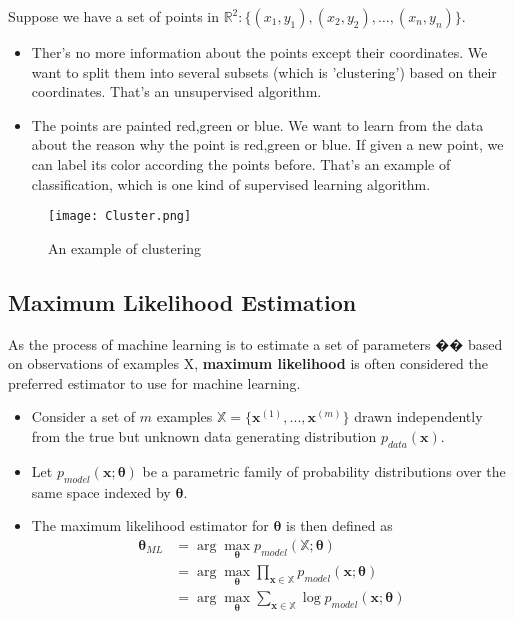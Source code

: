      Suppose we have a set of points in $\mathbb{R}^2: \{(x_1,y_1),(x_2,y_2),\dots,(x_n,y_n)\}$.
     \begin{itemize}
         \item Ther's no more information about the points except their coordinates. We want to split them into several subsets (which is 'clustering') based on their coordinates. That's an unsupervised algorithm.
         \item The points are painted red,green or blue. We want to learn from the data about the reason why the point is red,green or blue. If given a new point, we can label its color according the points before. That's an example of classification, which is one kind of supervised learning algorithm.
     \end{itemize}
     \begin{figure}[htbp]
         \centering
         \texttt{[image: Cluster.png]}
         \caption{An example of clustering}
     \end{figure}
    \subsection{Maximum Likelihood Estimation}
    As the process of machine learning is to estimate a set of parameters �� based on observations of examples X, \textbf{maximum likelihood} is often considered the preferred estimator to use for machine learning.	

    \begin{itemize}
        \item Consider a set of $m$ examples $\mathbb X=\{\bm x^{(1)},...,\bm x^{(m)}\}$ drawn independently from the true but unknown data generating distribution $p_{data}(\bm x)$.
        \item Let $p_{model}(\bm x;\bm \theta)$ be a parametric family of probability distributions over the same space indexed by $\bm \theta$.
        \item The maximum likelihood estimator for $\bm \theta$ is then defined as 
            \begin{equation*}
                \begin{split}
                    \bm \theta_{ML} &= \arg \max_{\bm \theta}p_{model}(\mathbb X;\bm \theta) \\
                    &=\arg \max_{\bm \theta}\prod_{\bm x \in \mathbb X} p_{model}(\bm x;\bm \theta)\\
                    &=\arg \max_{\bm \theta}\sum_{\bm x \in \mathbb X} \log p_{model}(\bm x;\bm \theta)\\
                \end{split}
            \end{equation*}
    \end{itemize}

